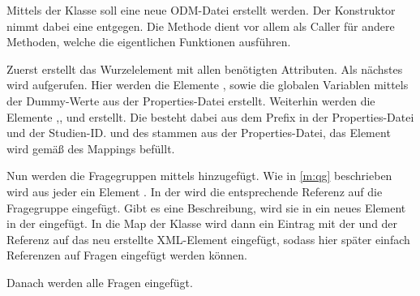 Mittels der Klasse  soll eine neue ODM-Datei erstellt werden. Der Konstruktor nimmt dabei eine  entgegen.
Die Methode  dient vor allem als Caller für andere Methoden, welche die eigentlichen Funktionen ausführen.

Zuerst erstellt  das Wurzelelement  mit allen benötigten Attributen.
Als nächstes wird  aufgerufen. Hier werden die Elemente , sowie die globalen Variablen mittels der Dummy-Werte aus der Properties-Datei erstellt.
Weiterhin werden die Elemente ,,  und  erstellt.
Die  besteht dabei aus dem Prefix in der Properties-Datei und der Studien-ID.
 und  des  stammen aus der Properties-Datei, das Element  wird gemäß des Mappings befüllt.

Nun werden die Fragegruppen mittels  hinzugefügt. Wie in \cref{m:qg} beschrieben wird aus jeder  ein Element .
In der  wird die entsprechende Referenz auf die Fragegruppe eingefügt.
Gibt es eine Beschreibung, wird sie in ein neues Element  in der  eingefügt.
In die Map  der Klasse  wird dann ein Eintrag mit der  und der Referenz auf das neu erstellte XML-Element eingefügt, sodass hier später einfach Referenzen auf Fragen eingefügt werden können.

Danach werden alle Fragen eingefügt.


